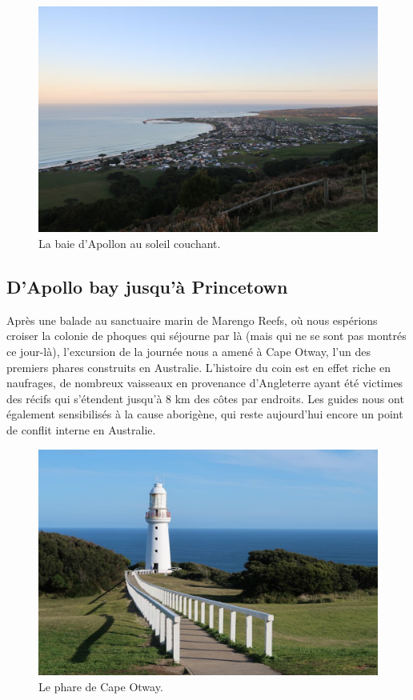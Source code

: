 \begin{figure}
\centering
\includegraphics{images/20180731_apollobay.JPG}
\caption{La baie d'Apollon au soleil couchant.}
\end{figure}

\hypertarget{dapollo-bay-jusquuxe0-princetown}{%
\subsection{D'Apollo bay jusqu'à
Princetown}\label{dapollo-bay-jusquuxe0-princetown}}

Après une balade au sanctuaire marin de Marengo Reefs, où nous espérions
croiser la colonie de phoques qui séjourne par là (mais qui ne se sont
pas montrés ce jour-là), l'excursion de la journée nous a amené à Cape
Otway, l'un des premiers phares construits en Australie. L'histoire du
coin est en effet riche en naufrages, de nombreux vaisseaux en
provenance d'Angleterre ayant été victimes des récifs qui s'étendent
jusqu'à 8 km des côtes par endroits. Les guides nous ont également
sensibilisés à la cause aborigène, qui reste aujourd'hui encore un point
de conflit interne en Australie.

\begin{figure}
\centering
\includegraphics{images/20180731_capeotway.JPG}
\caption{Le phare de Cape Otway.}
\end{figure}

